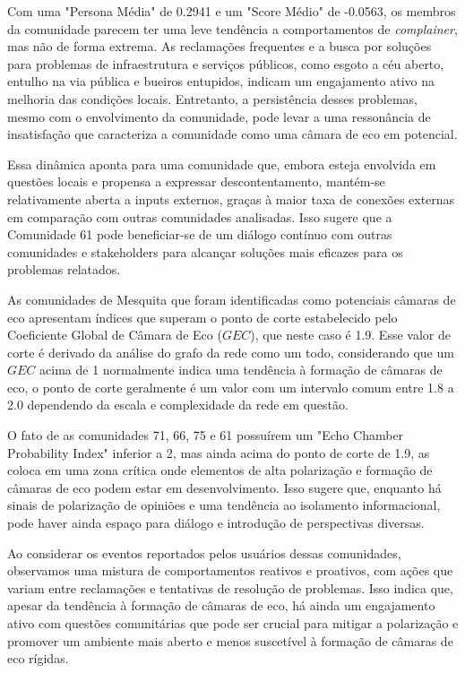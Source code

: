 Com uma "Persona Média" de 0.2941 e um "Score Médio" de -0.0563, os membros da comunidade parecem ter uma leve tendência a comportamentos de \textit{complainer}, mas não de forma extrema. As reclamações frequentes e a busca por soluções para problemas de infraestrutura e serviços públicos, como esgoto a céu aberto, entulho na via pública e bueiros entupidos, indicam um engajamento ativo na melhoria das condições locais. Entretanto, a persistência desses problemas, mesmo com o envolvimento da comunidade, pode levar a uma ressonância de insatisfação que caracteriza a comunidade como uma câmara de eco em potencial.

Essa dinâmica aponta para uma comunidade que, embora esteja envolvida em questões locais e propensa a expressar descontentamento, mantém-se relativamente aberta a inputs externos, graças à maior taxa de conexões externas em comparação com outras comunidades analisadas. Isso sugere que a Comunidade 61 pode beneficiar-se de um diálogo contínuo com outras comunidades e stakeholders para alcançar soluções mais eficazes para os problemas relatados.

As comunidades de Mesquita que foram identificadas como potenciais câmaras de eco apresentam índices que superam o ponto de corte estabelecido pelo Coeficiente Global de Câmara de Eco ($GEC$), que neste caso é 1.9. Esse valor de corte é derivado da análise do grafo da rede como um todo, considerando que um $GEC$ acima de 1 normalmente indica uma tendência à formação de câmaras de eco, o ponto de corte geralmente é um valor com um intervalo comum entre 1.8 a 2.0 dependendo da escala e complexidade da rede em questão.

O fato de as comunidades 71, 66, 75 e 61 possuírem um "Echo Chamber Probability Index" inferior a 2, mas ainda acima do ponto de corte de 1.9, as coloca em uma zona crítica onde elementos de alta polarização e formação de câmaras de eco podem estar em desenvolvimento. Isso sugere que, enquanto há sinais de polarização de opiniões e uma tendência ao isolamento informacional, pode haver ainda espaço para diálogo e introdução de perspectivas diversas.

Ao considerar os eventos reportados pelos usuários dessas comunidades, observamos uma mistura de comportamentos reativos e proativos, com ações que variam entre reclamações e tentativas de resolução de problemas. Isso indica que, apesar da tendência à formação de câmaras de eco, há ainda um engajamento ativo com questões comunitárias que pode ser crucial para mitigar a polarização e promover um ambiente mais aberto e menos suscetível à formação de câmaras de eco rígidas.

